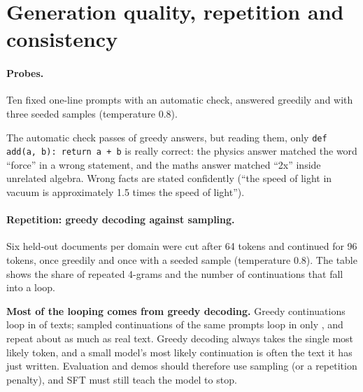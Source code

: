 \documentclass[11pt,a4paper]{article}
\begin{document}
\section{Generation quality, repetition and consistency}
\paragraph{Probes.} Ten fixed one-line prompts with an automatic check, answered greedily and with three seeded samples (temperature 0.8).

\begin{table}[H]\centering\small

\caption{Probe results. ``Loop'' means the greedy answer keeps repeating itself.}
\end{table}

\noindent The automatic check passes \ProbeGreedy{} of \ProbeN{} greedy answers, but reading them, only \texttt{def add(a, b): return a + b} is
really correct: the physics answer matched the word ``force'' in a wrong statement, and the maths answer matched ``2x'' inside unrelated algebra.
Wrong facts are stated confidently (``the speed of light in vacuum is approximately 1.5 times the speed of light'').

\paragraph{Repetition: greedy decoding against sampling.} Six held-out documents per domain were cut after 64 tokens and continued for 96 tokens,
once greedily and once with a seeded sample (temperature 0.8). The table shows the share of repeated 4-grams and the number of continuations that
fall into a loop.

\begin{table}[H]\centering\small

\caption{Repeated 4-grams in the real continuation, in greedy output and in sampled output, and repetition loops.}
\end{table}

\noindent \textbf{Most of the looping comes from greedy decoding.} Greedy continuations loop in \LoopsGreedy{} of \LoopTexts{} texts; sampled
continuations of the same prompts loop in only \LoopsSampled, and repeat about as much as real text. Greedy decoding always takes the single most
likely token, and a small model's most likely continuation is often the text it has just written. Evaluation and demos should therefore use
sampling (or a repetition penalty), and SFT must still teach the model to stop.
\end{document}

